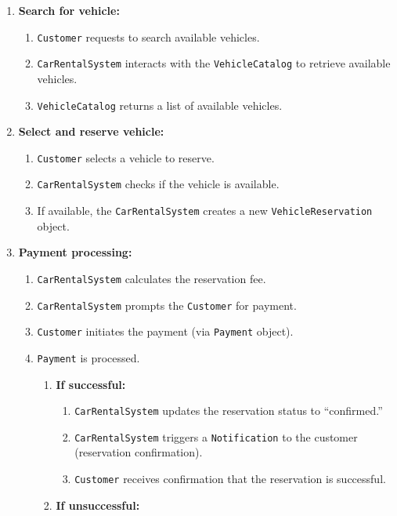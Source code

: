 \begin{enumerate}
\item
\protect{}\label{4SMn5fxy9pio37RnYAMDf}
\textbf{Search for vehicle:}

\begin{enumerate}
\item
\texttt{Customer} requests to search available vehicles.
\item
\texttt{CarRentalSystem} interacts with the \texttt{VehicleCatalog} to retrieve available vehicles.
\item
\texttt{VehicleCatalog} returns a list of available vehicles.
\end{enumerate}
\item
\protect{}\label{jUyslL1Hd3VTbJZTGtQ8U}
\textbf{Select and reserve vehicle:}

\begin{enumerate}
\item
\texttt{Customer} selects a vehicle to reserve.
\item
\texttt{CarRentalSystem} checks if the vehicle is available.
\item
If available, the \texttt{CarRentalSystem} creates a new \texttt{VehicleReservation} object.
\end{enumerate}
\item
\protect{}\label{ThQyx33nc3n4kd6ZFpsCW}
\textbf{Payment processing:}

\begin{enumerate}
\item
\texttt{CarRentalSystem} calculates the reservation fee.
\item
\texttt{CarRentalSystem} prompts the \texttt{Customer} for payment.
\item
\texttt{Customer} initiates the payment (via \texttt{Payment} object).
\item
\texttt{Payment} is processed.

\begin{enumerate}
\item
\textbf{If successful:}

\begin{enumerate}
\item
\texttt{CarRentalSystem} updates the reservation status to ``confirmed.''
\item
\texttt{CarRentalSystem} triggers a \texttt{Notification} to the customer (reservation confirmation).
\item
\texttt{Customer} receives confirmation that the reservation is successful.
\end{enumerate}
\item
\textbf{If unsuccessful:}


\end{enumerate}
\end{enumerate}
\end{enumerate}
